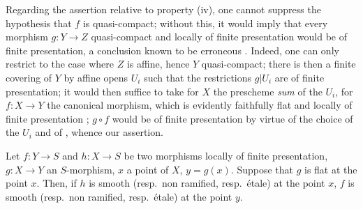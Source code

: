 \begin{remark}[17.7.6]
\label{IV.17.7.6}
Regarding the assertion relative to property (iv), one cannot suppress the hypothesis that $f$ is quasi-compact; without this, it would imply that every morphism $g:Y\to Z$ quasi-compact and locally of finite presentation would be of finite presentation, a conclusion known to be erroneous .
Indeed, one can only restrict to the case where $Z$ is affine, hence $Y$ quasi-compact; there is then a finite covering of $Y$ by affine opens $U_i$ such that the restrictions $g|U_i$ are of finite presentation; it would then suffice to take for $X$ the prescheme \emph{sum} of the $U_i$, for $f:X\to Y$ the canonical morphism, which is evidently faithfully flat and locally of finite presentation ; $g\circ f$ would be of finite presentation by virtue of the choice of the $U_i$ and of , whence our assertion.
\end{remark}

\begin{proposition}[17.7.7]
\label{IV.17.7.7}
Let $f:Y\to S$ and $h:X\to S$ be two morphisms locally of finite presentation, $g:X\to Y$ an $S$-morphism, $x$ a point of $X$, $y=g(x)$.
Suppose that $g$ is flat at the point $x$.
Then, if $h$ is smooth (resp.\ non ramified, resp.\ \'etale) at the point $x$, $f$ is smooth (resp.\ non ramified, resp.\ \'etale) at the point $y$.
\end{proposition}

